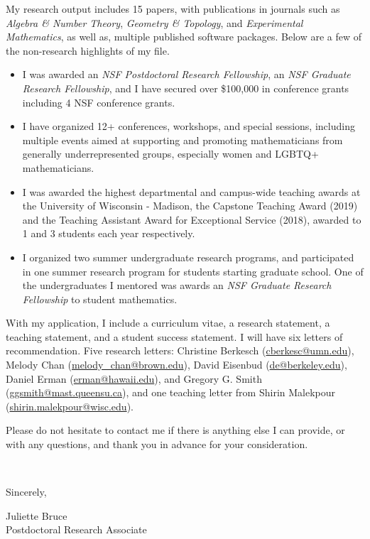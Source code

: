 \documentclass[11pt]{article}
\begin{document}
My research output includes 15 papers, with publications in journals such as \textit{Algebra \& Number Theory}, \textit{Geometry \& Topology}, and \textit{Experimental Mathematics}, as well as, multiple published software packages. Below are a few of the non-research highlights of my file.

\begin{itemize}[leftmargin=*]
\item I was awarded an \textit{NSF Postdoctoral Research Fellowship}, an \textit{NSF Graduate Research Fellowship}, and I have secured over \$100,000 in conference grants including 4 NSF conference grants. 
\item I have organized 12+ conferences, workshops, and special sessions, including multiple events aimed at supporting and promoting mathematicians from generally underrepresented groups, especially women and LGBTQ+ mathematicians. 
\item I was awarded the highest departmental and campus-wide teaching awards at the University of Wisconsin - Madison, the Capstone Teaching Award (2019) and the Teaching Assistant Award for Exceptional Service (2018), awarded to 1 and 3 students each year respectively. 
\item I organized two summer undergraduate research programs, and participated in one summer research program for students starting graduate school. One of the undergraduates I mentored was awards an \textit{NSF Graduate Research Fellowship} to student mathematics.  
\end{itemize}

With my application, I include a curriculum vitae, a research statement, a teaching statement, and a student success statement.  I will have six letters of recommendation. Five research letters: Christine Berkesch (\href{mailto:cberkesc@umn.edu}{cberkesc@umn.edu}), Melody Chan (\href{mailto:melody\_chan@brown.edu}{melody\_chan@brown.edu}), David Eisenbud  (\href{mailto:de@berkeley.edu
}{de@berkeley.edu}), Daniel Erman (\href{mailto:erman@hawaii.edu}{erman@hawaii.edu}), and Gregory G. Smith (\href{mailto:ggsmith@mast.queensu.ca}{ggsmith@mast.queensu.ca}), and one teaching letter from Shirin Malekpour (\href{mailto:shirin.malekpour@wisc.edu}{shirin.malekpour@wisc.edu}).  


Please do not hesitate to contact me if there is anything else I can provide, or with any questions, and thank you in advance for your consideration. 

\vspace{24pt}
\noindent
\begin{minipage}{0.99\textwidth}
\begin{minipage}{0.69\textwidth}
\textcolor{white}{.}
\end{minipage}
\begin{minipage}{0.29\textwidth}
Sincerely, 

\vspace{36pt}
Juliette Bruce\\
Postdoctoral Research Associate\end{minipage}
\end{minipage}
\end{document}

